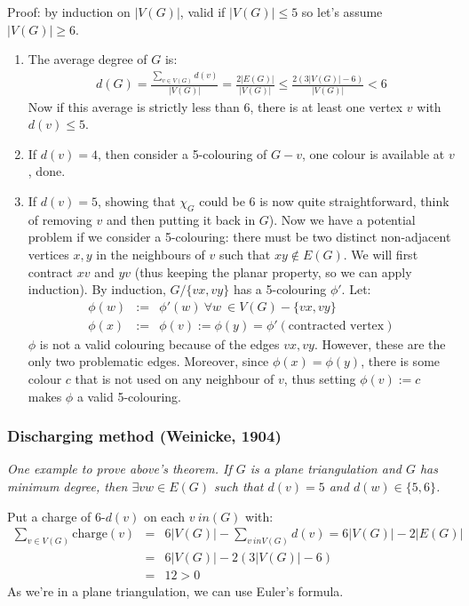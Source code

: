 		Proof: by induction on $|V(G)|$, valid if $|V(G)| \leq 5$ so let's assume $|V(G)| \geq 6$. 
		\begin{enumerate}
			\item The average degree of $G$ is:
				\begin{eqnarray}
					d(G) = \frac{\sum_{v \in V(G)} d(v)}{|V(G)|} = \frac{2 |E(G)|}{|V(G)|} \leq \frac{2 (3|V(G)| - 6)}{|V(G)|} < 6
				\end{eqnarray}
				Now if this average is strictly less than 6, there is at least one vertex $v$ with $d(v) \leq 5$.
			\item If $d(v) = 4$, then consider a 5-colouring of $G-v$, one colour is available at $v$, done.
			\item If $d(v) = 5$, showing that $\chi_{G}$ could be 6 is now quite straightforward, think of removing $v$ and then putting it back in $G$). Now we have a potential problem if we consider a 5-colouring: there must be two distinct non-adjacent vertices $x, y$ in the neighbours of $v$ such that $xy \notin E(G)$. We will first contract $xv$ and $yv$ (thus keeping the planar property, so we can apply induction). By induction, $G / \{ vx, vy \}$ has a 5-colouring $\phi'$. Let:
				\begin{eqnarray}
					\phi(w) &:=& \phi'(w) ~\forall w\ \in V(G) - \{ vx, vy \}\\
					\phi(x) &:=& \phi(v) := \phi(y) = \phi'(\text{contracted vertex})
				\end{eqnarray}
				$\phi$ is not a valid colouring because of the edges $vx, vy$. However, these are the only two problematic edges. Moreover, since $\phi(x) = \phi(y)$, there is some colour $c$ that is not used on any neighbour of $v$, thus setting $\phi(v) := c$ makes $\phi$ a valid 5-colouring.
		\end{enumerate}
		
		
		\subsubsection{Discharging method (Weinicke, 1904)}
		\textit{One example to prove above's theorem. If $G$ is a plane triangulation and $G$ has minimum degree, then $\exists vw \in E(G)$ such that $d(v) = 5$ and $d(w) \in \{ 5, 6 \}$.\\}
		
		Put a charge of 6-$d(v)$ on each $v \ in (G)$ with:
		\begin{eqnarray}
			\sum_{v \in V(G)} \text{charge}(v) &=& 6 |V(G)| - \sum_{v \ in V(G)} d(v) = 6 |V(G)| - 2 |E(G)|\\
			&=& 6 |V(G)| - 2 (3|V(G)| - 6) \\
			&=& 12 > 0
		\end{eqnarray}
		As we're in a plane triangulation, we can use Euler's formula.\\
		
